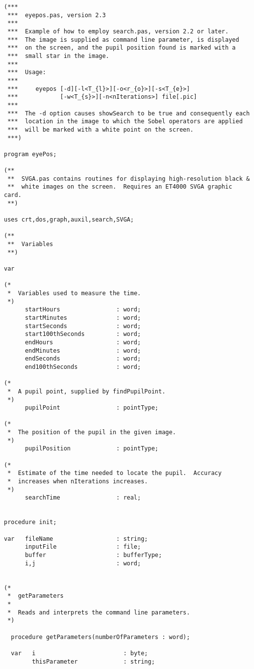 \begin{verbatim}
(***
 ***  eyepos.pas, version 2.3
 ***
 ***  Example of how to employ search.pas, version 2.2 or later.
 ***  The image is supplied as command line parameter, is displayed
 ***  on the screen, and the pupil position found is marked with a
 ***  small star in the image.
 ***
 ***  Usage:
 ***
 ***     eyepos [-d][-l<T_{l}>][-o<r_{o}>][-s<T_{e}>]
 ***            [-w<T_{s}>][-n<nIterations>] file[.pic]
 ***
 ***  The -d option causes showSearch to be true and consequently each
 ***  location in the image to which the Sobel operators are applied
 ***  will be marked with a white point on the screen.
 ***)

program eyePos;

(**
 **  SVGA.pas contains routines for displaying high-resolution black &
 **  white images on the screen.  Requires an ET4000 SVGA graphic card.
 **)

uses crt,dos,graph,auxil,search,SVGA;

(**
 **  Variables
 **)

var

(*
 *  Variables used to measure the time.
 *)
      startHours                : word;
      startMinutes              : word;
      startSeconds              : word;
      start100thSeconds         : word;
      endHours                  : word;
      endMinutes                : word;
      endSeconds                : word;
      end100thSeconds           : word;

(*
 *  A pupil point, supplied by findPupilPoint.
 *)
      pupilPoint                : pointType;

(*
 *  The position of the pupil in the given image.
 *)
      pupilPosition             : pointType;

(*
 *  Estimate of the time needed to locate the pupil.  Accuracy
 *  increases when nIterations increases.
 *)
      searchTime                : real;


procedure init;

var   fileName                  : string;
      inputFile                 : file;
      buffer                    : bufferType;
      i,j                       : word;


(*
 *  getParameters
 *
 *  Reads and interprets the command line parameters.
 *)

  procedure getParameters(numberOfParameters : word);

  var   i                         : byte;
        thisParameter             : string;



\end{verbatim}
